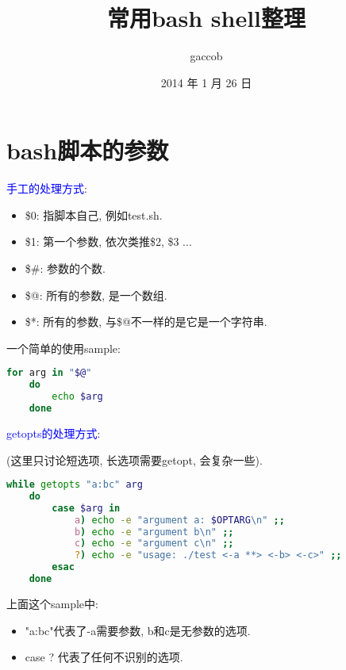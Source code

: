 
\title {\ZHH \huge 常用bash shell整理}
\author {\small gaccob}
\date {\small 2014 年 1 月 26 日}
\maketitle

\section {\ZHH bash脚本的参数} {
    { \textcolor{blue}{手工的处理方式}: } \par
    \begin{itemize}
    \item {\small \$0: 指脚本自己, 例如test.sh. }
    \item {\small \$1: 第一个参数, 依次类推\$2, \$3 ... }
    \item {\small \$\#: 参数的个数. }
    \item {\small \$@: 所有的参数, 是一个数组. }
    \item {\small \$*: 所有的参数, 与\$@不一样的是它是一个字符串. }
    \end{itemize} \par
    { 一个简单的使用sample: }\par
    \gaccobsplitinv
    \begin{lstlisting}[language=bash]
    for arg in "$@"
    do
        echo $arg
    done
    \end{lstlisting}

    \gaccobsplitinv

    { \textcolor{blue}{getopts的处理方式}: }\par
    { (这里只讨论短选项, 长选项需要getopt, 会复杂一些). } \par
    \gaccobsplitinv
    \begin{lstlisting}[language=bash]
    while getopts "a:bc" arg
    do
        case $arg in
            a) echo -e "argument a: $OPTARG\n" ;;
            b) echo -e "argument b\n" ;;
            c) echo -e "argument c\n" ;;
            ?) echo -e "usage: ./test <-a **> <-b> <-c>" ;;
        esac
    done
    \end{lstlisting}
    { 上面这个sample中: }\par
    \begin{itemize}
    \item {\small "a:bc"代表了-a需要参数, b和c是无参数的选项. }
    \item {\small case ? 代表了任何不识别的选项. }
    \end{itemize}
}



